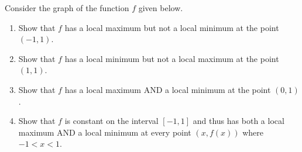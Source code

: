 {Consider the graph of the function $f$ given below.  

\begin{center}
\end{center}

\begin{enumerate}

\item Show that $f$ has a local maximum but not a local minimum at the point $(-1, 1)$.

\item Show that $f$ has a local minimum but not a local maximum at the point $(1, 1)$.

\item Show that $f$ has a local maximum AND a local minimum at the point $(0, 1)$.

\item Show that $f$ is constant on the interval $[-1, 1]$ and thus has both a local maximum AND a local minimum at every point $(x, f(x))$ where $-1 < x < 1$.

\end{enumerate} }
{}
